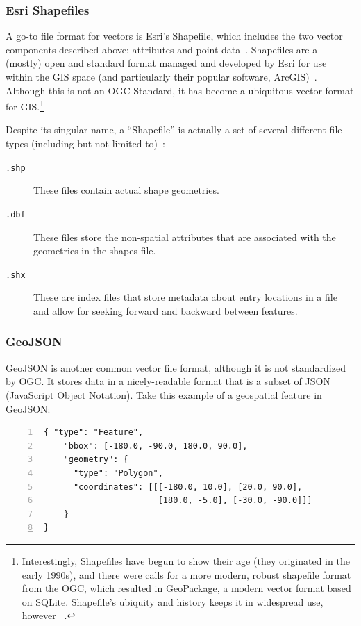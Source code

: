 \subsubsection{Esri Shapefiles}
A go-to file format for vectors is Esri's Shapefile, which includes the two vector components described above: attributes and point data~\cite{Environ1998}. Shapefiles are a (mostly) open and standard format managed and developed by Esri for use within the GIS space (and particularly their popular software, ArcGIS)~\cite{Environ1998}. Although this is not an OGC Standard, it has become a ubiquitous vector format for GIS.\footnote{Interestingly, Shapefiles have begun to show their age (they originated in the early 1990s), and there were calls for a more modern, robust shapefile format from the OGC, which resulted in GeoPackage, a modern vector format based on SQLite. Shapefile's ubiquity and history keeps it in widespread use, however ~\cite{slashgeo,GeoPackage}.}

Despite its singular name, a ``Shapefile'' is actually a set of several different file types (including but not limited to)~\cite{Environ1998}:

\begin{description}
  \item[\tt{.shp}] These files contain actual shape geometries.
  \item[\tt{.dbf}] These files store the non-spatial attributes that are associated with the geometries in the shapes file.
  \item[\tt{.shx}] These are index files that store metadata about entry locations in a file and allow for seeking forward and backward between features.
\end{description}

\subsubsection{GeoJSON}
GeoJSON is another common vector file format, although it is not standardized by OGC. It stores data in a nicely-readable format that is a subset of JSON (JavaScript Object Notation). Take this example of a geospatial feature in GeoJSON:

\begin{Verbatim}[samepage=true,baselinestretch=1,numbers=left,xleftmargin=12mm]
{ "type": "Feature",
    "bbox": [-180.0, -90.0, 180.0, 90.0],
    "geometry": {
      "type": "Polygon",
      "coordinates": [[[-180.0, 10.0], [20.0, 90.0],
                       [180.0, -5.0], [-30.0, -90.0]]]
    }
}
\end{Verbatim}

